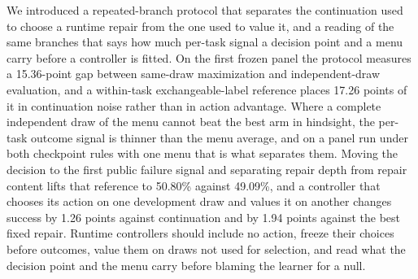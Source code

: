 We introduced a repeated-branch protocol that separates the continuation used to choose a runtime repair from the one used to value it, and a reading of the same branches that says how much per-task signal a decision point and a menu carry before a controller is fitted. On the first frozen panel the protocol measures a 15.36-point gap between same-draw maximization and independent-draw evaluation, and a within-task exchangeable-label reference places 17.26 points of it in continuation noise rather than in action advantage. Where a complete independent draw of the menu cannot beat the best arm in hindsight, the per-task outcome signal is thinner than the menu average, and on a panel run under both checkpoint rules with one menu that is what separates them. Moving the decision to the first public failure signal and separating repair depth from repair content lifts that reference to 50.80\% against 49.09\%, and a controller that chooses its action on one development draw and values it on another changes success by 1.26 points against continuation and by 1.94 points against the best fixed repair. Runtime controllers should include no action, freeze their choices before outcomes, value them on draws not used for selection, and read what the decision point and the menu carry before blaming the learner for a null.
